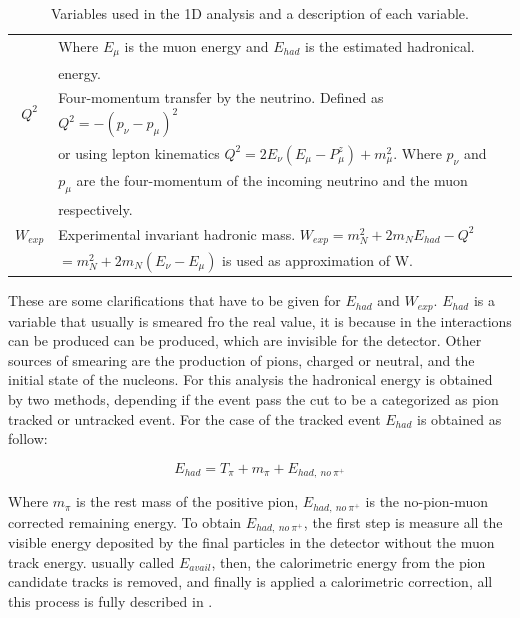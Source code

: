 \begin{table}[!htb]
\begin{tabular}{c|l}
                     & Where $E_\mu$ is the muon energy and $E_{had}$ is the estimated hadronical. \\
                     & energy. \\
        \hline
        $Q^2$        & Four-momentum transfer by the neutrino. Defined as $Q^2 = - (p_\nu -p_\mu)^2$\\ 
                     & or using lepton kinematics $Q^2 = 2E_\nu(E_\mu-P^z_\mu) + m^2_\mu$. Where $p_\nu$ and\\ 
                     & $p_\mu$ are the four-momentum of the incoming neutrino and the muon\\
                     & respectively.\\ 
        \hline
        $W_{exp}$    & Experimental invariant hadronic mass. $W_{exp} = m^2_N + 2m_NE_{had} - Q^2$ \\
                     & $= m^2_N + 2m_N(E_\nu-E_\mu)$ is used as approximation of W.\\
        \hline
    \end{tabular}
    \caption{Variables used in the 1D analysis and a description of each variable.}
    \label{tab:Analisys:AnaVariables:1Danalysis}
\end{table}

These are some clarifications that have to be given for $E_{had}$ and $W_{exp}$. $E_{had}$ is a variable that usually is smeared fro the real value, it is because in the interactions can be produced can be produced, which are invisible for the detector. Other sources of smearing are the production of pions, charged or neutral, and the initial state of the nucleons. For this analysis the hadronical energy is obtained by two methods, depending if the event pass the cut to be a categorized as pion tracked or untracked event. For the case of the tracked event $E_{had}$ is obtained as follow:

\begin{equation}
    E_{had} = T_\pi + m_\pi + E_{had,\ no\ \pi^+}
    \label{eq:EhadTracked}
\end{equation}

Where $m_\pi$ is the rest mass of the positive pion, $E_{had,\ no\ \pi^+}$ is the  no-pion-muon corrected remaining energy. To obtain $E_{had,\ no\ \pi^+}$, the first step is measure all the visible energy deposited by the final particles in the detector without the muon track energy. usually called $E_{avail}$, then, the calorimetric energy from the pion candidate tracks is removed, and finally is applied a calorimetric correction, all this process is fully described in \cite{AaronThesis}.  

